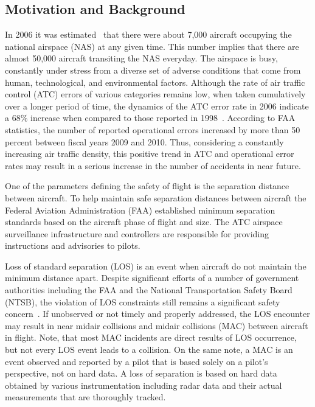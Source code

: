 \documentclass[letter,onecolumn,12pt]{aiaa-tc}
\newcommand{\1}{1_n}
\begin{document}
\subsection{Motivation and Background}
In 2006 it was estimated~\cite{FAA_ATO_2006} that there were about 7,000 aircraft occupying the national airspace (NAS) at any given time. This number implies that there are almost 50,000 aircraft transiting the NAS everyday. The airspace is busy, constantly under stress from a diverse set of adverse conditions that come from human, technological, and environmental factors. Although the rate of air traffic control (ATC) errors of various categories remains low,  when taken cumulatively over a longer period of time, the dynamics of the ATC error rate in 2006 indicate a $68\%$  increase when compared to those reported in 1998~\cite{USAToday_2006}. According to FAA statistics, the number of reported operational errors increased by more than 50 percent between fiscal years 2009 and 2010. Thus, considering a constantly increasing air traffic density, this positive trend in ATC and operational error rates may result in a serious increase in the number of accidents in near future.

One of the parameters defining the safety of flight is the separation distance between aircraft. To help maintain safe separation distances between aircraft the Federal Aviation Administration (FAA) established minimum separation standards based on the aircraft phase of flight and size. The ATC airspace surveillance infrastructure and controllers are responsible for providing instructions and advisories to pilots.

Loss of standard separation (LOS) is an event when aircraft do not maintain the minimum distance apart. Despite significant efforts of a number of government authorities including the FAA and the National Transportation Safety Board (NTSB), the violation of LOS constraints still remains a significant safety concern~\cite{OIG_AR2013}. If unobserved or not timely and properly addressed, the LOS encounter may result in near midair collisions and midair collisions (MAC) between aircraft in flight. Note, that most MAC incidents are direct results of LOS occurrence, but not every LOS event leads to a collision. On the same note, a MAC is an event observed and reported by a pilot that is based solely on a pilot's perspective, not on hard data. A loss of separation is based on hard data obtained by various instrumentation including radar data and their actual measurements that are thoroughly tracked.
\end{document}
